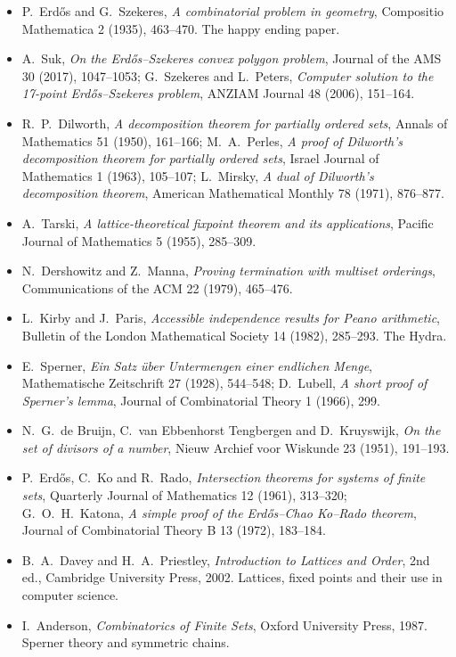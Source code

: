 \begin{itemize}
\item P.~Erd\H os and G.~Szekeres, \emph{A combinatorial problem in geometry}, Compositio Mathematica 2 (1935), 463--470.
The happy ending paper.
\item A.~Suk, \emph{On the Erd\H os--Szekeres convex polygon problem}, Journal of the AMS 30 (2017), 1047--1053; G.~Szekeres
and L.~Peters, \emph{Computer solution to the 17-point Erd\H os--Szekeres problem}, ANZIAM Journal 48 (2006), 151--164.
\item R.~P.~Dilworth, \emph{A decomposition theorem for partially ordered sets}, Annals of Mathematics 51 (1950), 161--166;
M.~A.~Perles, \emph{A proof of Dilworth's decomposition theorem for partially ordered sets}, Israel Journal of Mathematics 1
(1963), 105--107; L.~Mirsky, \emph{A dual of Dilworth's decomposition theorem}, American Mathematical Monthly 78 (1971), 876--877.
\item A.~Tarski, \emph{A lattice-theoretical fixpoint theorem and its applications}, Pacific Journal of Mathematics 5 (1955),
285--309.
\item N.~Dershowitz and Z.~Manna, \emph{Proving termination with multiset orderings}, Communications of the ACM 22 (1979),
465--476.
\item L.~Kirby and J.~Paris, \emph{Accessible independence results for Peano arithmetic}, Bulletin of the London
Mathematical Society 14 (1982), 285--293. The Hydra.
\item E.~Sperner, \emph{Ein Satz \"uber Untermengen einer endlichen Menge}, Mathematische Zeitschrift 27 (1928), 544--548;
D.~Lubell, \emph{A short proof of Sperner's lemma}, Journal of Combinatorial Theory 1 (1966), 299.
\item N.~G.~de Bruijn, C.~van Ebbenhorst Tengbergen and D.~Kruyswijk, \emph{On the set of divisors of a number}, Nieuw
Archief voor Wiskunde 23 (1951), 191--193.
\item P.~Erd\H os, C.~Ko and R.~Rado, \emph{Intersection theorems for systems of finite sets}, Quarterly Journal of
Mathematics 12 (1961), 313--320; G.~O.~H.~Katona, \emph{A simple proof of the Erd\H os--Chao Ko--Rado theorem}, Journal of
Combinatorial Theory B 13 (1972), 183--184.
\item B.~A.~Davey and H.~A.~Priestley, \emph{Introduction to Lattices and Order}, 2nd ed., Cambridge University Press, 2002.
Lattices, fixed points and their use in computer science.
\item I.~Anderson, \emph{Combinatorics of Finite Sets}, Oxford University Press, 1987. Sperner theory and symmetric chains.
\end{itemize}


